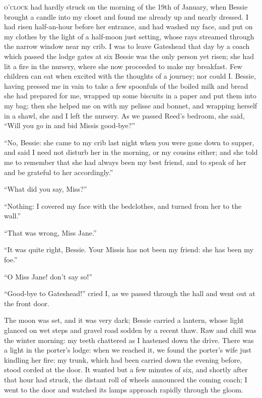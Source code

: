 
 \textsc{o'clock} had hardly struck on the morning of the 19th of January,
when Bessie brought a candle into my closet and found me already up and
nearly dressed. I had risen half-an-hour before her entrance, and had
washed my face, and put on my clothes by the light of a half-moon just
setting, whose rays streamed through the narrow window near my crib. I
was to leave Gateshead that day by a coach which passed the lodge gates
at six \AM{} Bessie was the only person yet risen; she had lit a fire in
the nursery, where she now proceeded to make my breakfast. Few children
can eat when excited with the thoughts of a journey; nor could I\@.
Bessie, having pressed me in vain to take a few spoonfuls of the boiled
milk and bread she had prepared for me, wrapped up some biscuits in a
paper and put them into my bag; then she helped me on with my pelisse
and bonnet, and wrapping herself in a shawl, she and I left the
nursery. As we passed \Mrs{} Reed's bedroom, she said, \enquote{Will you
	go in and bid Missis good-bye?}

\enquote{No, Bessie: she came to my crib last night when you were gone
	down to supper, and said I need not disturb her in the morning, or my
	cousins either; and she told me to remember that she had always been my
	best friend, and to speak of her and be grateful to her accordingly.}

\enquote{What did you say, Miss?}

\enquote{Nothing: I covered my face with the bedclothes, and turned from
	her to the wall.}

\enquote{That was wrong, Miss Jane.}

\enquote{It was quite right, Bessie. Your Missis has not been my
	friend: she has been my foe.}

\enquote{O Miss Jane! don't say so!}

\enquote{Good-bye to Gateshead!} cried I, as we passed through the hall
and went out at the front door.

The moon was set, and it was very dark; Bessie carried a lantern, whose
light glanced on wet steps and gravel road sodden by a recent thaw. Raw
and chill was the winter morning: my teeth chattered as I hastened down
the drive. There was a light in the porter's lodge: when we reached it,
we found the porter's wife just kindling her fire: my trunk, which had
been carried down the evening before, stood corded at the door. It
wanted but a few minutes of six, and shortly after that hour had struck,
the distant roll of wheels announced the coming coach; I went to the
door and watched its lamps approach rapidly through the gloom.

